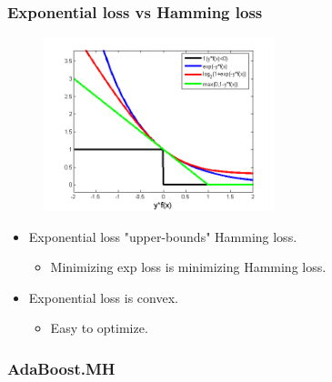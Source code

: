 \documentclass{beamer}
\begin{document}
\begin{frame}
\frametitle{Exponential loss vs Hamming loss}

\begin{figure}
\includegraphics[width=0.6\textwidth]{img/convex-bounds.png}
\end{figure}

\begin{itemize}
\item Exponential loss "upper-bounds" Hamming loss.
  \begin{itemize}
    \item Minimizing exp loss is minimizing Hamming loss.
  \end{itemize}
\item Exponential loss is convex.
  \begin{itemize}
    \item Easy to optimize.
  \end{itemize}
\end{itemize}

\end{frame}

\begin{frame}
\frametitle{AdaBoost.MH}
\begin{algorithm}[H]
\end{algorithm}
\end{frame}
\end{document}
